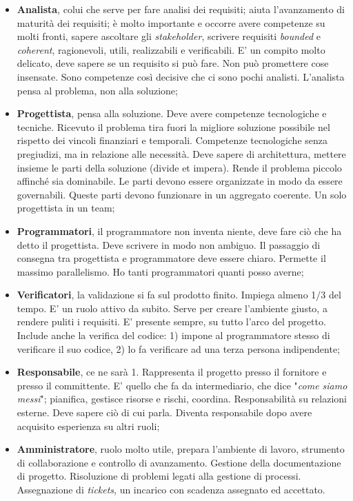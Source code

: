 \begin{itemize}

	\item \textbf{Analista}, colui che serve per fare analisi dei requisiti; aiuta l'avanzamento di maturità dei requisiti; è molto importante e occorre avere competenze su molti fronti, sapere ascoltare gli \textit{stakeholder}, scrivere requisiti \textit{bounded} e \textit{coherent}, ragionevoli, utili, realizzabili e verificabili. E'  un compito molto delicato, deve sapere se un requisito si può fare. Non può promettere cose insensate. Sono competenze così decisive che ci sono pochi analisti. L'analista pensa al problema, non alla soluzione;
	
	\item \textbf{Progettista}, pensa alla soluzione. Deve avere competenze tecnologiche e tecniche. Ricevuto il problema tira fuori la migliore soluzione possibile nel rispetto dei vincoli finanziari e temporali. Competenze tecnologiche senza pregiudizi, ma in relazione alle necessità. Deve sapere di architettura, mettere insieme le parti della soluzione (divide et impera). Rende il problema piccolo affinché sia dominabile. Le parti devono essere organizzate in modo da essere governabili. Queste parti devono funzionare in un aggregato coerente. Un solo progettista in un team;
	
	\item \textbf{Programmatori}, il programmatore non inventa niente, deve fare ciò che ha detto il progettista. Deve scrivere in modo non ambiguo. Il passaggio di consegna tra progettista e programmatore deve essere chiaro. Permette il massimo parallelismo. Ho tanti programmatori quanti posso averne;
	
	\item \textbf{Verificatori}, la validazione si fa sul prodotto finito. Impiega almeno 1/3 del tempo. E' un ruolo attivo da subito. Serve per creare l'ambiente giusto, a rendere puliti i requisiti. E' presente sempre, su tutto l'arco del progetto. Include anche la verifica del codice: 1) impone al programmatore stesso di verificare il suo codice, 2) lo fa verificare ad una terza persona indipendente;
	
	\item \textbf{Responsabile}, ce ne sarà 1. Rappresenta il progetto presso il fornitore e presso il committente. E' quello che fa da intermediario, che dice "\textit{come siamo messi}"; pianifica, gestisce risorse e rischi, coordina. Responsabilità su relazioni esterne. Deve sapere ciò di cui parla. Diventa responsabile dopo avere acquisito esperienza su altri ruoli;
	
	\item \textbf{Amministratore}, ruolo molto utile, prepara l'ambiente di lavoro, strumento di collaborazione e controllo di avanzamento. Gestione della documentazione di progetto. Risoluzione di problemi legati alla gestione di processi. Assegnazione di \textit{tickets}, un incarico con scadenza assegnato ed accettato.


\end{itemize}

